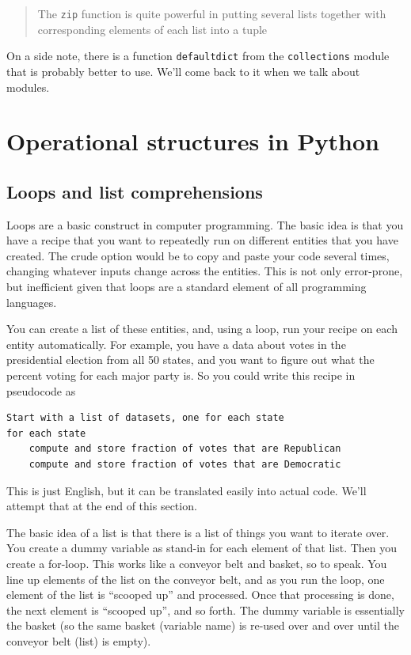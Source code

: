 \documentclass[
  letterpaper,
]{scrbook}
\begin{document}
\begin{quote}
The \texttt{zip} function is quite powerful in putting several lists together with corresponding elements of each list into a tuple
\end{quote}

On a side note, there is a function \texttt{defaultdict} from the \texttt{collections} module that is probably better to use. We'll come back to it when we talk about modules.

\hypertarget{operational-structures-in-python}{%
\section{Operational structures in Python}\label{operational-structures-in-python}}

\hypertarget{loops-and-list-comprehensions}{%
\subsection{Loops and list comprehensions}\label{loops-and-list-comprehensions}}

Loops are a basic construct in computer programming. The basic idea is that you have a recipe that you want to repeatedly run on different entities that you have created. The crude option would be to copy and paste your code several times, changing whatever inputs change across the entities. This is not only error-prone, but inefficient given that loops are a standard element of all programming languages.

You can create a list of these entities, and, using a loop, run your recipe on each entity automatically. For example, you have a data about votes in the presidential election from all 50 states, and you want to figure out what the percent voting for each major party is. So you could write this recipe in pseudocode as

\begin{verbatim}
Start with a list of datasets, one for each state
for each state
    compute and store fraction of votes that are Republican
    compute and store fraction of votes that are Democratic
\end{verbatim}

This is just English, but it can be translated easily into actual code. We'll attempt that at the end of this section.

The basic idea of a list is that there is a list of things you want to iterate over. You create a dummy variable as stand-in for each element of that list. Then you create a for-loop. This works like a conveyor belt and basket, so to speak. You line up elements of the list on the conveyor belt, and as you run the loop, one element of the list is ``scooped up'' and processed. Once that processing is done, the next element is ``scooped up'', and so forth. The dummy variable is essentially the basket (so the same basket (variable name) is re-used over and over until the conveyor belt (list) is empty).
\end{document}
